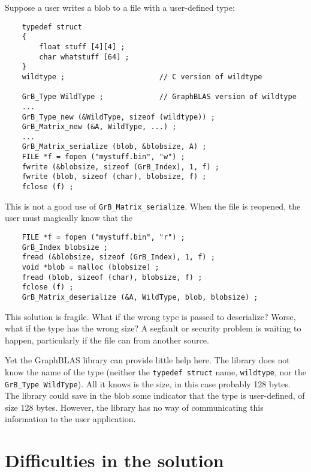 \documentclass[12pt]{article}
\begin{document}
Suppose a user writes a blob to a file with a user-defined type:

{\footnotesize
\begin{verbatim}
    typedef struct
    {
        float stuff [4][4] ;
        char whatstuff [64] ;
    }
    wildtype ;                      // C version of wildtype

    GrB_Type WildType ;             // GraphBLAS version of wildtype
    ...
    GrB_Type_new (&WildType, sizeof (wildtype)) ;
    GrB_Matrix_new (&A, WildType, ...) ;
    ...
    GrB_Matrix_serialize (blob, &blobsize, A) ;
    FILE *f = fopen ("mystuff.bin", "w") ; 
    fwrite (&blobsize, sizeof (GrB_Index), 1, f) ;
    fwrite (blob, sizeof (char), blobsize, f) ;
    fclose (f) ;
\end{verbatim}}

This is not a good use of \verb'GrB_Matrix_serialize'.  When the file is
reopened, the user must magically know that the

{\footnotesize
\begin{verbatim}
    FILE *f = fopen ("mystuff.bin", "r") ; 
    GrB_Index blobsize ;
    fread (&blobsize, sizeof (GrB_Index), 1, f) ;
    void *blob = malloc (blobsize) ;
    fread (blob, sizeof (char), blobsize, f) ;
    fclose (f) ;
    GrB_Matrix_deserialize (&A, WildType, blob, blobsize) ;
\end{verbatim}}

This solution is fragile.  What if the wrong type is passed to deserialize?
Worse, what if the type has the wrong size?  A segfault or security problem
is waiting to happen, particularly if the file can from another source.

Yet the GraphBLAS library can provide little help here.  The library does not
know the name of the type (neither the \verb'typedef struct' name,
\verb'wildtype', nor the \verb'GrB_Type WildType').  All it knows is the size,
in this case probably 128 bytes.  The library could save in the blob some
indicator that the type is user-defined, of size 128 bytes.  However, the
library has no way of communicating this information to the user application.

\section{Difficulties in the solution}
\end{document}
